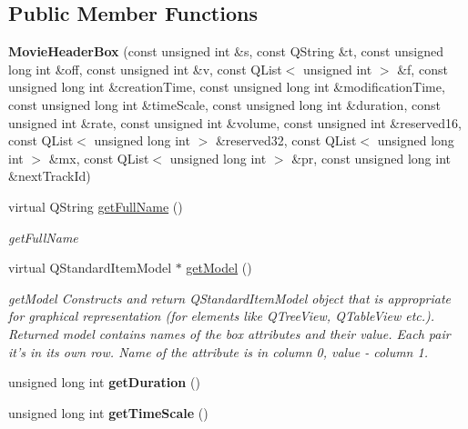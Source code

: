 \subsection*{Public Member Functions}
\begin{DoxyCompactItemize}
\item 
\hypertarget{class_movie_header_box_a686c826b13d4dde96d8a453b2dac558b}{{\bfseries Movie\-Header\-Box} (const unsigned int \&s, const Q\-String \&t, const unsigned long int \&off, const unsigned int \&v, const Q\-List$<$ unsigned int $>$ \&f, const unsigned long int \&creation\-Time, const unsigned long int \&modification\-Time, const unsigned long int \&time\-Scale, const unsigned long int \&duration, const unsigned int \&rate, const unsigned int \&volume, const unsigned int \&reserved16, const Q\-List$<$ unsigned long int $>$ \&reserved32, const Q\-List$<$ unsigned long int $>$ \&mx, const Q\-List$<$ unsigned long int $>$ \&pr, const unsigned long int \&next\-Track\-Id)}\label{class_movie_header_box_a686c826b13d4dde96d8a453b2dac558b}

\item 
virtual Q\-String \hyperlink{class_movie_header_box_a90549b1eef690572412b138e3743e6c4}{get\-Full\-Name} ()
\begin{DoxyCompactList}\small\item\em get\-Full\-Name \end{DoxyCompactList}\item 
virtual Q\-Standard\-Item\-Model $\ast$ \hyperlink{class_movie_header_box_a84bc9141e1de6ad9de73c00c9d861c7a}{get\-Model} ()
\begin{DoxyCompactList}\small\item\em get\-Model Constructs and return Q\-Standard\-Item\-Model object that is appropriate for graphical representation (for elements like Q\-Tree\-View, Q\-Table\-View etc.). Returned model contains names of the box attributes and their value. Each pair it's in its own row. Name of the attribute is in column 0, value -\/ column 1. \end{DoxyCompactList}\item 
\hypertarget{class_movie_header_box_aa0846ad516bc00c568c8574fa00feba5}{unsigned long int {\bfseries get\-Duration} ()}\label{class_movie_header_box_aa0846ad516bc00c568c8574fa00feba5}

\item 
\hypertarget{class_movie_header_box_afe7780215eb8d05666edc59141c0b16b}{unsigned long int {\bfseries get\-Time\-Scale} ()}\label{class_movie_header_box_afe7780215eb8d05666edc59141c0b16b}

\end{DoxyCompactItemize}

